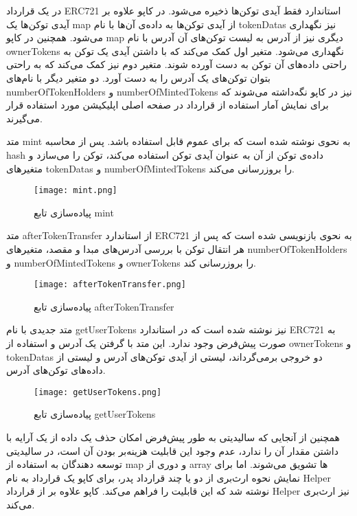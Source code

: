 در یک قرارداد ERC721 استاندارد فقط آیدی توکن‌ها ذخیره می‌شود. در کاپو علاوه بر آیدی توکن‌ها یک map از آیدی توکن‌ها به داده‌ی آن‌ها با نام tokenDatas نیز نگهداری می‌شود. همچنین در کاپو map دیگری نیز از آدرس به لیست توکن‌های آن آدرس با نام ownerTokens نگهداری می‌شود. متغیر اول کمک می‌کند که با داشتن آیدی یک توکن به راحتی داده‌های آن توکن به دست آورده شوند. متغیر دوم نیز کمک می‌کند که به راحتی بتوان توکن‌های یک آدرس را به دست آورد. دو متغیر دیگر با نام‌های numberOfTokenHolders و numberOfMintedTokens نیز در کاپو نگه‌داشته می‌شوند که برای نمایش آمار استفاده از قرارداد در صفحه اصلی اپلیکیشن مورد استفاده قرار می‌گیرند.

متد mint به نحوی نوشته شده است که برای عموم قابل استفاده باشد. پس از محاسبه hash داده‌ی توکن از آن به عنوان آیدی توکن استفاده می‌کند، توکن را می‌سازد و متغیرهای tokenDatas و numberOfMintedTokens را بروزرسانی می‌کند.

\begin{figure}[ht]
\centerline{\texttt{[image: mint.png]}}
\caption{پیاده‌سازی تابع mint}
\label{fig:mint}
\end{figure}

متد afterTokenTransfer از استاندارد ERC721 به نحوی بازنویسی
شده است که پس از هر انتقال توکن با بررسی آدرس‌های مبدا و مقصد، متغیر‌های numberOfTokenHolders و numberOfMintedTokens و ownerTokens را بروزرسانی کند.

\begin{figure}[ht]
\centerline{\texttt{[image: afterTokenTransfer.png]}}
\caption{پیاده‌سازی تابع afterTokenTransfer}
\label{fig:afterTokenTransfer}
\end{figure}

متد جدیدی با نام getUserTokens نیز نوشته شده است که در استاندارد ERC721 به صورت پیش‌فرض وجود ندارد. این متد با گرفتن یک آدرس و استفاده از ownerTokens و tokenDatas دو خروجی برمی‌گرداند، لیستی از آیدی توکن‌های آدرس و لیستی از داده‌های توکن‌های آدرس.

\begin{figure}[ht]
\centerline{\texttt{[image: getUserTokens.png]}}
\caption{پیاده‌سازی تابع getUserTokens}
\label{fig:getUserTokens}
\end{figure}

همچنین از آنجایی که سالیدیتی به طور پیش‌فرض امکان حذف یک داده از یک آرایه با داشتن مقدار آن را ندارد، عدم وجود این قابلیت هزینه‌بر بودن آن است، در سالیدیتی توسعه دهندگان به استفاده از map و دوری از array ها تشویق می‌شوند. اما برای نمایش نحوه ارث‌بری از دو یا چند قرارداد پدر، برای کاپو یک قرارداد به نام Helper نوشته شد که این قابلیت را فراهم می‌کند. کاپو علاوه بر
از قرارداد Helper نیز ارث‌بری می‌کند.

